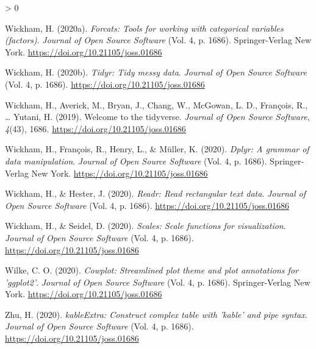 \documentclass[
  english,
  ,man,floatsintext]{apa6}
\newlength{\cslhangindent}
\newenvironment{CSLReferences}[2] %
 {%
  \setlength{\parindent}{0pt}
  \ifodd #1 \everypar{\setlength{\hangindent}{\cslhangindent}}\ignorespaces\fi
  \ifnum #2 > 0
  \setlength{\parskip}{#2\baselineskip}
  \fi
 }%
 {}
\begin{document}
\begin{CSLReferences}{1}{0}
\leavevmode\hypertarget{ref-R-forcats}{}%
Wickham, H. (2020a). \emph{Forcats: Tools for working with categorical variables (factors)}. \emph{Journal of Open Source Software} (Vol. 4, p. 1686). Springer-Verlag New York. \url{https://doi.org/10.21105/joss.01686}

\leavevmode\hypertarget{ref-R-tidyr}{}%
Wickham, H. (2020b). \emph{Tidyr: Tidy messy data}. \emph{Journal of Open Source Software} (Vol. 4, p. 1686). \url{https://doi.org/10.21105/joss.01686}

\leavevmode\hypertarget{ref-R-tidyverse}{}%
Wickham, H., Averick, M., Bryan, J., Chang, W., McGowan, L. D., François, R., \ldots{} Yutani, H. (2019). Welcome to the {tidyverse}. \emph{Journal of Open Source Software}, \emph{4}(43), 1686. \url{https://doi.org/10.21105/joss.01686}

\leavevmode\hypertarget{ref-R-dplyr}{}%
Wickham, H., François, R., Henry, L., \& Müller, K. (2020). \emph{Dplyr: A grammar of data manipulation}. \emph{Journal of Open Source Software} (Vol. 4, p. 1686). Springer-Verlag New York. \url{https://doi.org/10.21105/joss.01686}

\leavevmode\hypertarget{ref-R-readr}{}%
Wickham, H., \& Hester, J. (2020). \emph{Readr: Read rectangular text data}. \emph{Journal of Open Source Software} (Vol. 4, p. 1686). \url{https://doi.org/10.21105/joss.01686}

\leavevmode\hypertarget{ref-R-scales}{}%
Wickham, H., \& Seidel, D. (2020). \emph{Scales: Scale functions for visualization}. \emph{Journal of Open Source Software} (Vol. 4, p. 1686). \url{https://doi.org/10.21105/joss.01686}

\leavevmode\hypertarget{ref-R-cowplot}{}%
Wilke, C. O. (2020). \emph{Cowplot: Streamlined plot theme and plot annotations for 'ggplot2'}. \emph{Journal of Open Source Software} (Vol. 4, p. 1686). Springer-Verlag New York. \url{https://doi.org/10.21105/joss.01686}

\leavevmode\hypertarget{ref-R-kableExtra}{}%
Zhu, H. (2020). \emph{kableExtra: Construct complex table with 'kable' and pipe syntax}. \emph{Journal of Open Source Software} (Vol. 4, p. 1686). \url{https://doi.org/10.21105/joss.01686}

\end{CSLReferences}

\endgroup


\clearpage
\makeatletter
\efloat@restorefloats
\makeatother
\end{document}
